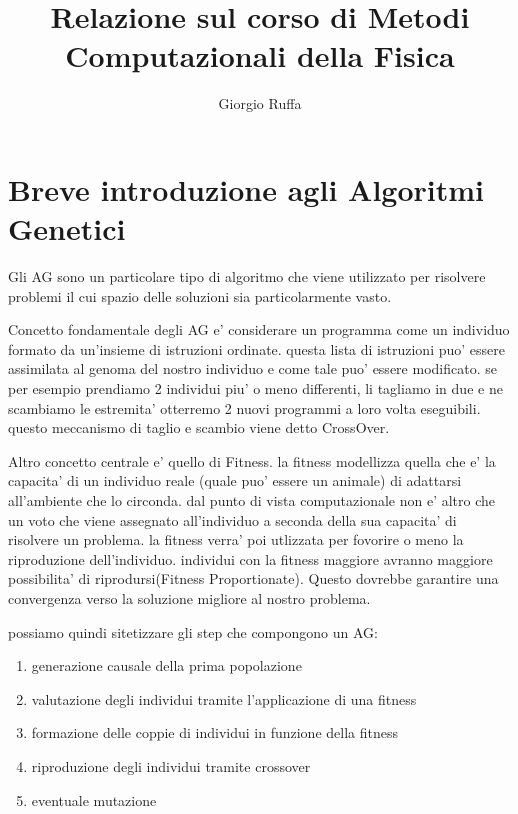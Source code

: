 \documentclass[12pt, a4paper]{article}
\title{Relazione sul corso di Metodi Computazionali della Fisica}
\author{Giorgio Ruffa}
\begin{document}
\maketitle

\tableofcontents

\section{Breve introduzione agli Algoritmi Genetici}
\label{sec:intro}
Gli AG sono un particolare tipo di algoritmo che viene utilizzato per risolvere problemi il cui spazio delle soluzioni sia particolarmente vasto. 

Concetto fondamentale degli AG e' considerare un programma come un individuo formato da un'insieme di istruzioni ordinate. questa lista di istruzioni puo' essere assimilata al genoma del nostro individuo e come tale puo' essere modificato. se per esempio prendiamo 2 individui piu' o meno differenti, li tagliamo in due e ne scambiamo le estremita' otterremo 2 nuovi programmi a loro volta eseguibili.
questo meccanismo di taglio e scambio viene detto CrossOver.

Altro concetto centrale e' quello di Fitness. la fitness modellizza quella che e' la capacita' di un individuo reale (quale puo' essere un animale) di adattarsi all'ambiente che lo circonda. dal punto di vista computazionale non e' altro che un voto che viene assegnato all'individuo a seconda della sua capacita' di risolvere un problema. la fitness verra' poi utlizzata per fovorire o meno la riproduzione dell'individuo. individui con la fitness maggiore avranno maggiore possibilita' di riprodursi(Fitness Proportionate). Questo dovrebbe garantire una convergenza verso la soluzione migliore al nostro problema.

possiamo quindi sitetizzare gli step che compongono un AG:

\begin{enumerate}
	\item generazione causale della prima popolazione
	\item valutazione degli individui tramite l'applicazione di una fitness
	\item formazione delle coppie di individui in funzione della fitness
	\item riproduzione degli individui tramite crossover
	\item eventuale mutazione
\end{enumerate}
\end{document}

